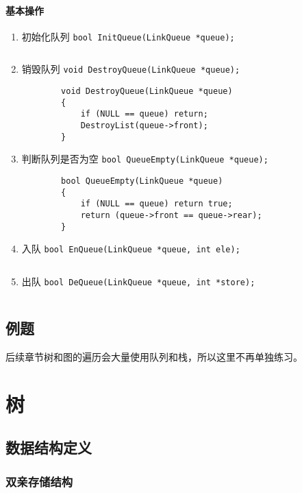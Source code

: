 \documentclass{ctexart}
\begin{document}
\paragraph{基本操作}
\begin{enumerate}
    \item 初始化队列 \texttt{bool InitQueue(LinkQueue *queue);}
        \inputminted{c}{codes/init-link-queue.c}

    \item 销毁队列 \texttt{void DestroyQueue(LinkQueue *queue);}
        \begin{verbatim}
        void DestroyQueue(LinkQueue *queue)
        {
            if (NULL == queue) return;
            DestroyList(queue->front);
        }
        \end{verbatim}

    \item 判断队列是否为空 \texttt{bool QueueEmpty(LinkQueue *queue);}
        \begin{verbatim}
        bool QueueEmpty(LinkQueue *queue)
        {
            if (NULL == queue) return true;
            return (queue->front == queue->rear);
        }
        \end{verbatim}

    \item 入队 \texttt{bool EnQueue(LinkQueue *queue, int ele);}
        \inputminted{c}{codes/enqueue-link-queue.c}

    \item 出队 \texttt{bool DeQueue(LinkQueue *queue, int *store);}
        \inputminted{c}{codes/dequeue-link-queue.c}

\end{enumerate}

\subsection{例题}
后续章节树和图的遍历会大量使用队列和栈，所以这里不再单独练习。


\section{树}
\subsection{数据结构定义}
\subsubsection{双亲存储结构}
\end{document}
